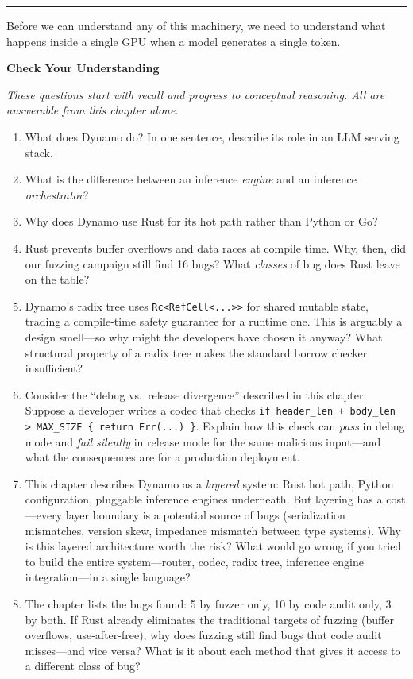 \medskip
\begin{center}\rule{0.5\linewidth}{0.4pt}\end{center}
\medskip

Before we can understand any of this machinery, we need to understand what happens inside a single GPU when a model generates a single token.

\medskip
\noindent\textbf{Check Your Understanding}

\smallskip
\noindent\emph{These questions start with recall and progress to conceptual reasoning. All are answerable from this chapter alone.}

\begin{enumerate}
  \item What does Dynamo do? In one sentence, describe its role in an LLM serving stack.
  \item What is the difference between an inference \emph{engine} and an inference \emph{orchestrator}?
  \item Why does Dynamo use Rust for its hot path rather than Python or Go?
  \item Rust prevents buffer overflows and data races at compile time. Why, then, did our fuzzing campaign still find 16 bugs? What \emph{classes} of bug does Rust leave on the table?
  \item Dynamo's radix tree uses \texttt{Rc<RefCell<...>{}>} for shared mutable state, trading a compile-time safety guarantee for a runtime one. This is arguably a design smell---so why might the developers have chosen it anyway? What structural property of a radix tree makes the standard borrow checker insufficient?
  \item Consider the ``debug vs.\ release divergence'' described in this chapter. Suppose a developer writes a codec that checks \texttt{if header\_len + body\_len > MAX\_SIZE \{ return Err(...) \}}. Explain how this check can \emph{pass} in debug mode and \emph{fail silently} in release mode for the same malicious input---and what the consequences are for a production deployment.
  \item This chapter describes Dynamo as a \emph{layered} system: Rust hot path, Python configuration, pluggable inference engines underneath. But layering has a cost---every layer boundary is a potential source of bugs (serialization mismatches, version skew, impedance mismatch between type systems). Why is this layered architecture worth the risk? What would go wrong if you tried to build the entire system---router, codec, radix tree, inference engine integration---in a single language?
  \item The chapter lists the bugs found: 5 by fuzzer only, 10 by code audit only, 3 by both. If Rust already eliminates the traditional targets of fuzzing (buffer overflows, use-after-free), why does fuzzing still find bugs that code audit misses---and vice versa? What is it about each method that gives it access to a different class of bug?
\end{enumerate}

